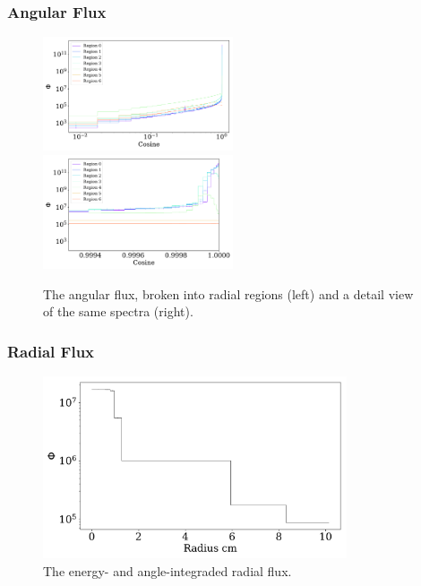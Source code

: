 \documentclass[fleqn]{beamer}
\begin{document}
\begin{frame}
\frametitle{Angular Flux}

\begin{figure}
\centering
\includegraphics[width = 0.5\textwidth]{flux_rad_cos}
\includegraphics[width = 0.5\textwidth]{flux_rad_cos_detail}
\caption{The angular flux, broken into radial regions (left) and a detail view of the same spectra (right).}
\end{figure}

\end{frame}

\begin{frame}
\frametitle{Radial Flux}

\begin{figure}
\centering
\includegraphics[width = 0.8\textwidth]{flux_rad}
\caption{The energy- and angle-integraded radial flux.}
\end{figure}

\end{frame}

\end{document}

